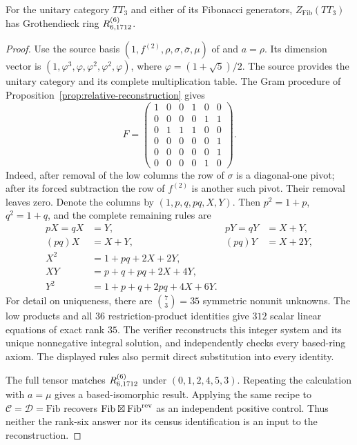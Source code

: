 \begin{corollary}\label{cor:tt3-relative}
For the unitary category $TT_3$ and either of its Fibonacci generators,
$Z_{\mathrm{Fib}}(TT_3)$ has Grothendieck ring $R^{(6)}_{6,1712}$.
\end{corollary}
\begin{proof}
Use the source basis $(1,f^{(2)},\rho,\sigma,\bar\sigma,\mu)$ of
\cite[Definition~2.5]{EM} and $a=\rho$. Its dimension vector is
$(1,\varphi^3,\varphi,\varphi^2,\varphi^2,\varphi)$,
where $\varphi=(1+\sqrt5)/2$. The source provides the unitary category and
its complete multiplication table. The Gram procedure of
Proposition~\ref{prop:relative-reconstruction} gives
\[
 F=\begin{pmatrix}
 1&0&0&1&0&0\\
 0&0&0&0&1&1\\
 0&1&1&1&0&0\\
 0&0&0&0&0&1\\
 0&0&0&0&0&1\\
 0&0&0&0&1&0
 \end{pmatrix}.
\]
Indeed, after removal of the low columns the row of $\sigma$ is a
diagonal-one pivot; after its forced subtraction the row of $f^{(2)}$
is another such pivot. Their removal leaves zero. Denote the columns by
$(1,p,q,pq,X,Y)$. Then $p^2=1+p$, $q^2=1+q$, and the complete remaining
rules are
\begin{align*}
 pX=qX&=Y,&pY=qY&=X+Y,\\
 (pq)X&=X+Y,&(pq)Y&=X+2Y,\\
 X^2&=1+pq+2X+2Y,\\
 XY&=p+q+pq+2X+4Y,\\
 Y^2&=1+p+q+2pq+4X+6Y.
\end{align*}
For detail on uniqueness, there are $\binom{7}{3}=35$ symmetric nonunit
unknowns. The low products and all $36$ restriction-product identities
give $312$ scalar linear equations of exact rank $35$. The verifier
reconstructs this integer system and its unique nonnegative integral
solution, and independently checks every based-ring axiom. The displayed
rules also permit direct substitution into every identity.

The full tensor matches $R^{(6)}_{6,1712}$ under $(0,1,2,4,5,3)$.
Repeating the calculation with $a=\mu$ gives a based-isomorphic result.
Applying the same recipe to $\mathcal C=\mathcal D=\mathrm{Fib}$ recovers
$\mathrm{Fib}\boxtimes\mathrm{Fib}^{\rm rev}$ as an independent positive
control. Thus neither the rank-six answer nor its census identification
is an input to the reconstruction.
\end{proof}


